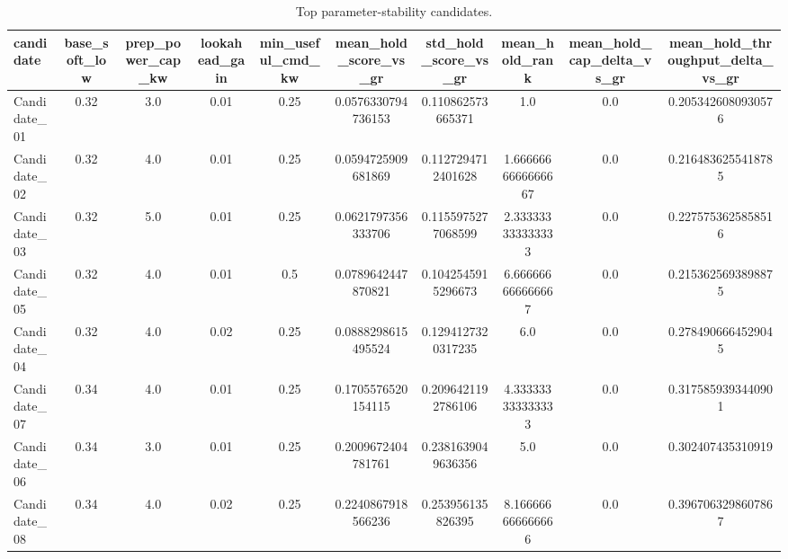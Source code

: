 \begin{table}[t]
\centering
\caption{Top parameter-stability candidates.}
\label{tab:param_top_auto}
\begin{tabular}{lccccccccc}
\toprule
candidate & base\_soft\_low & prep\_power\_cap\_kw & lookahead\_gain & min\_useful\_cmd\_kw & mean\_hold\_score\_vs\_gr & std\_hold\_score\_vs\_gr & mean\_hold\_rank & mean\_hold\_cap\_delta\_vs\_gr & mean\_hold\_throughput\_delta\_vs\_gr \\
\midrule
Candidate\_01 & 0.32 & 3.0 & 0.01 & 0.25 & 0.0576330794736153 & 0.110862573665371 & 1.0 & 0.0 & 0.2053426080930576 \\
Candidate\_02 & 0.32 & 4.0 & 0.01 & 0.25 & 0.0594725909681869 & 0.1127294712401628 & 1.6666666666666667 & 0.0 & 0.2164836255418785 \\
Candidate\_03 & 0.32 & 5.0 & 0.01 & 0.25 & 0.0621797356333706 & 0.1155975277068599 & 2.333333333333333 & 0.0 & 0.2275753625858516 \\
Candidate\_05 & 0.32 & 4.0 & 0.01 & 0.5 & 0.0789642447870821 & 0.1042545915296673 & 6.666666666666667 & 0.0 & 0.2153625693898875 \\
Candidate\_04 & 0.32 & 4.0 & 0.02 & 0.25 & 0.0888298615495524 & 0.1294127320317235 & 6.0 & 0.0 & 0.2784906664529045 \\
Candidate\_07 & 0.34 & 4.0 & 0.01 & 0.25 & 0.1705576520154115 & 0.2096421192786106 & 4.333333333333333 & 0.0 & 0.3175859393440901 \\
Candidate\_06 & 0.34 & 3.0 & 0.01 & 0.25 & 0.2009672404781761 & 0.2381639049636356 & 5.0 & 0.0 & 0.302407435310919 \\
Candidate\_08 & 0.34 & 4.0 & 0.02 & 0.25 & 0.2240867918566236 & 0.253956135826395 & 8.166666666666666 & 0.0 & 0.3967063298607867 \\
\bottomrule
\end{tabular}
\end{table}